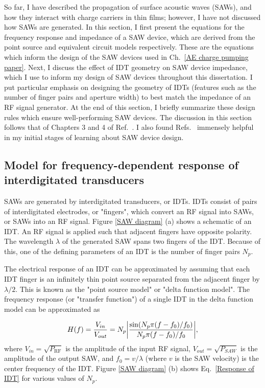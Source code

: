 \documentclass{beavtex_dub_edit}
\begin{document}
So far, I have described the propagation of surface acoustic waves (SAWs), and how they interact with charge carriers in thin films; however, I have not discussed how SAWs are generated. In this section, I first present the equations for the frequency response and impedance of a SAW device, which are derived from the point source and equivalent circuit models respectively. These are the equations which inform the design of the SAW devices used in Ch.\ \ref{AE charge pumping paper}. Next, I discuss the effect of IDT geometry on SAW device impedance, which I use to inform my design of SAW devices throughout this dissertation. I put particular emphasis on designing the geometry of IDTs (features such as the number of finger pairs and aperture width) to best match the impedance of an RF signal generator. At the end of this section, I briefly summarize these design rules which ensure well-performing SAW devices. The discussion in this section follows that of Chapters 3 and 4 of Ref.\ \cite{campbell_surface_1989}. I also found Refs.\ \cite{datta_surface_1986,lane_integrating_2021} immensely helpful in my initial stages of learning about SAW device design.

\subsection{Model for frequency-dependent response of interdigitated transducers}

SAWs are generated by interdigitated transducers, or IDTs. IDTs consist of pairs of interdigitated electrodes, or "fingers", which convert an RF signal into SAWs, or SAWs into an RF signal. Figure \ref{SAW diagram} (a) shows a schematic of an IDT. An RF signal is applied such that adjacent fingers have opposite polarity. The wavelength $\lambda$ of the generated SAW spans two fingers of the IDT. Because of this, one of the defining parameters of an IDT is the number of finger pairs $N_p$. 

The electrical response of an IDT can be approximated by assuming that each IDT finger is an infinitely thin point source separated from the adjacent finger by $\lambda/2$. This is known as the "point source model" or "delta function model". The frequency response (or "transfer function") of a single IDT in the delta function model can be approximated as \cite{campbell_surface_1989}

\begin{equation}
    \begin{split}
        H(f) = \frac{V_{in}}{V_{out}} = N_p \abs{\frac{\sin (N_p \pi (f-f_0) / f_0)}{N_p \pi (f-f_0) / f_0}},
    \end{split}
    \label{Response of IDT}
\end{equation}
where $V_{in} = \sqrt{P_{\mathrm{RF}}}$ is the amplitude of the input RF signal, $V_{out} = \sqrt{P_{SAW}}$ is the amplitude of the output SAW, and $f_0 = v/\lambda$ (where $v$ is the SAW velocity) is the center frequency of the IDT. Figure \ref{SAW diagram} (b) shows Eq.\ \ref{Response of IDT} for various values of $N_p$. 
\end{document}
